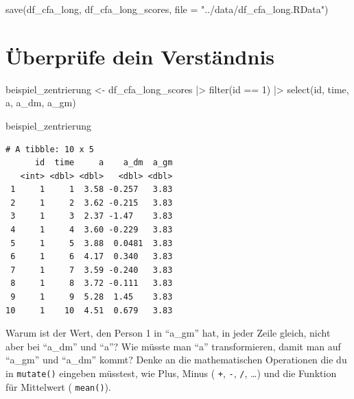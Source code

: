 \documentclass[
  letterpaper,
  DIV=11,
  numbers=noendperiod]{scrreprt}
\newenvironment{Shaded}{\begin{snugshade}}{\end{snugshade}}
\newcommand{\AttributeTok}[1]{\textcolor[rgb]{0.40,0.45,0.13}{#1}}
\newcommand{\DecValTok}[1]{\textcolor[rgb]{0.68,0.00,0.00}{#1}}
\newcommand{\FunctionTok}[1]{\textcolor[rgb]{0.28,0.35,0.67}{#1}}
\newcommand{\NormalTok}[1]{\textcolor[rgb]{0.00,0.23,0.31}{#1}}
\newcommand{\OtherTok}[1]{\textcolor[rgb]{0.00,0.23,0.31}{#1}}
\newcommand{\SpecialCharTok}[1]{\textcolor[rgb]{0.37,0.37,0.37}{#1}}
\newcommand{\StringTok}[1]{\textcolor[rgb]{0.13,0.47,0.30}{#1}}
\begin{document}
\begin{Shaded}
\begin{Highlighting}[]
\FunctionTok{save}\NormalTok{(df\_cfa\_long, df\_cfa\_long\_scores, }\AttributeTok{file =} \StringTok{"../data/df\_cfa\_long.RData"}\NormalTok{)}
\end{Highlighting}
\end{Shaded}

\section{Überprüfe dein
Verständnis}\label{uxfcberpruxfcfe-dein-verstuxe4ndnis}

\begin{Shaded}
\begin{Highlighting}[]
\NormalTok{beispiel\_zentrierung }\OtherTok{\textless{}{-}}\NormalTok{ df\_cfa\_long\_scores }\SpecialCharTok{|\textgreater{}} 
  \FunctionTok{filter}\NormalTok{(id }\SpecialCharTok{==} \DecValTok{1}\NormalTok{) }\SpecialCharTok{|\textgreater{}} 
  \FunctionTok{select}\NormalTok{(id, time, a, a\_dm, a\_gm)}

\NormalTok{beispiel\_zentrierung}
\end{Highlighting}
\end{Shaded}

\begin{verbatim}
# A tibble: 10 x 5
      id  time     a    a_dm  a_gm
   <int> <dbl> <dbl>   <dbl> <dbl>
 1     1     1  3.58 -0.257   3.83
 2     1     2  3.62 -0.215   3.83
 3     1     3  2.37 -1.47    3.83
 4     1     4  3.60 -0.229   3.83
 5     1     5  3.88  0.0481  3.83
 6     1     6  4.17  0.340   3.83
 7     1     7  3.59 -0.240   3.83
 8     1     8  3.72 -0.111   3.83
 9     1     9  5.28  1.45    3.83
10     1    10  4.51  0.679   3.83
\end{verbatim}

Warum ist der Wert, den Person 1 in ``a\_gm'' hat, in jeder Zeile
gleich, nicht aber bei ``a\_dm'' und ``a''? Wie müsste man ``a''
transformieren, damit man auf ``a\_gm'' und ``a\_dm'' kommt? Denke an
die mathematischen Operationen die du in \texttt{mutate()} eingeben
müsstest, wie Plus, Minus ( \texttt{+}, \texttt{-}, \texttt{/}, \ldots)
und die Funktion für Mittelwert ( \texttt{mean()}).
\end{document}
